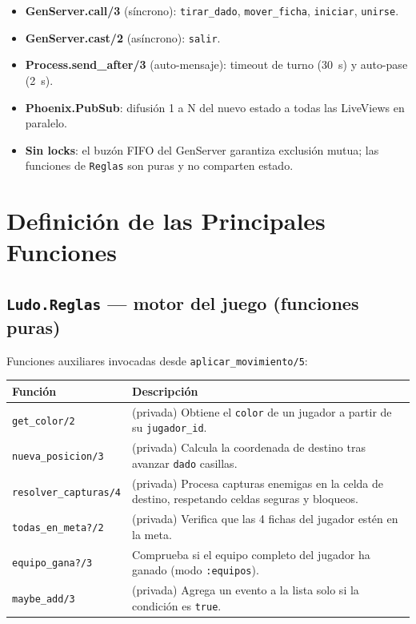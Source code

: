 \documentclass[11pt,a4paper]{article}
\begin{document}
\begin{itemize}[leftmargin=*, itemsep=2pt]
  \item \textbf{GenServer.call/3} (síncrono): \texttt{tirar\_dado},
    \texttt{mover\_ficha}, \texttt{iniciar}, \texttt{unirse}.
  \item \textbf{GenServer.cast/2} (asíncrono): \texttt{salir}.
  \item \textbf{Process.send\_after/3} (auto-mensaje): timeout de turno
    (30~s) y auto-pase (2~s).
  \item \textbf{Phoenix.PubSub}: difusión 1 a N del nuevo estado a todas
    las LiveViews en paralelo.
  \item \textbf{Sin locks}: el buzón FIFO del GenServer garantiza
    exclusión mutua; las funciones de \texttt{Reglas} son puras y no
    comparten estado.
\end{itemize}

\section{Definición de las Principales Funciones}

\subsection{\texttt{Ludo.Reglas} --- motor del juego (funciones puras)}

Funciones auxiliares invocadas desde \texttt{aplicar\_movimiento/5}:

\begin{center}
\renewcommand{\arraystretch}{1.3}
\begin{tabularx}{\linewidth}{l X}
\toprule
\textbf{Función} & \textbf{Descripción} \\
\midrule
\texttt{get\_color/2}        & (privada) Obtiene el \texttt{color} de un jugador a partir de su \texttt{jugador\_id}. \\
\texttt{nueva\_posicion/3}   & (privada) Calcula la coordenada de destino tras avanzar \texttt{dado} casillas. \\
\texttt{resolver\_capturas/4} & (privada) Procesa capturas enemigas en la celda de destino, respetando celdas seguras y bloqueos. \\
\texttt{todas\_en\_meta?/2}  & (privada) Verifica que las 4 fichas del jugador estén en la meta. \\
\texttt{equipo\_gana?/3}     & Comprueba si el equipo completo del jugador ha ganado (modo \texttt{:equipos}). \\
\texttt{maybe\_add/3}        & (privada) Agrega un evento a la lista solo si la condición es \texttt{true}. \\
\bottomrule
\end{tabularx}
\end{center}
\end{document}
